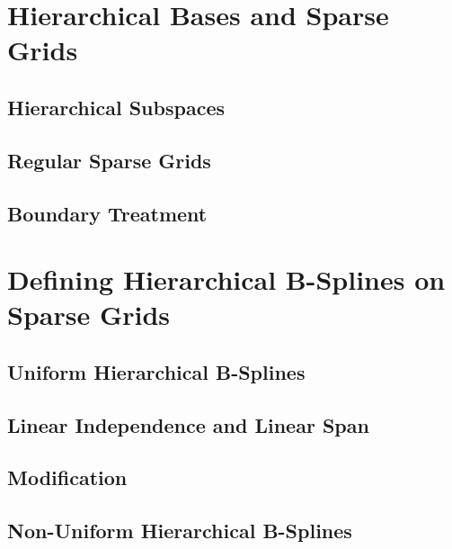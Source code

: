 
\section{Hierarchical Bases and Sparse Grids}


\subsection{Hierarchical Subspaces}


\subsection{Regular Sparse Grids}


\subsection{Boundary Treatment}


\section{Defining Hierarchical B-Splines on Sparse Grids}
\label{sec:sg_bspl}


\subsection{Uniform Hierarchical B-Splines}


\subsection{Linear Independence and Linear Span}


\subsection{Modification}


\subsection{Non-Uniform Hierarchical B-Splines}


